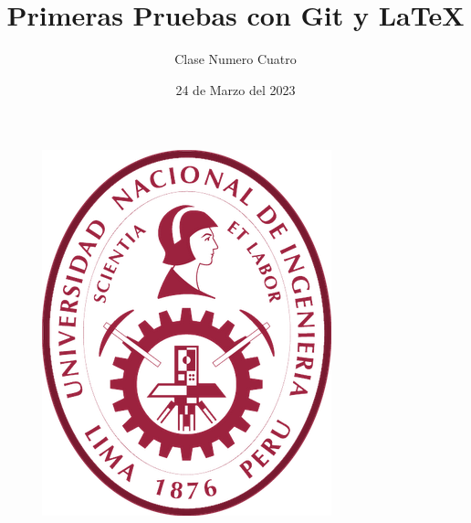 \documentclass{article}
\title{Primeras Pruebas con Git y \LaTeX}
\author{Clase Numero Cuatro}
\date{24 de Marzo del 2023}
\begin{document}
\maketitle
\lipsum[12-18]

\begin{figure}[h]
	\centering
	\includegraphics{LogoUNI.png}
\end{figure}
\end{document}
